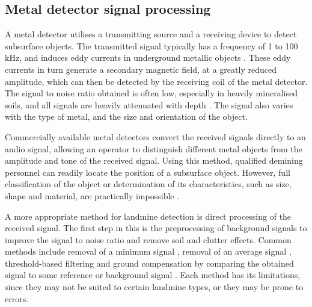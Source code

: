 \documentclass[main.tex]{subfiles}
\begin{document}
\subsection{Metal detector signal processing}
A metal detector utilises a transmitting source and a receiving device to detect subsurface objects. The transmitted signal typically has a frequency of 1 to 100 kHz, and induces eddy currents in underground metallic objects \parencite{bruschini2000phase}. These eddy currents in turn generate a secondary magnetic field, at a greatly reduced amplitude, which can then be detected by the receiving coil of the metal detector. The signal to noise ratio obtained is often low, especially in heavily mineralised soils, and all signals are heavily attenuated with depth \parencite{Candy2008}. The signal also varies with the type of metal, and the size and orientation of the object.

Commercially available metal detectors convert the received signals directly to an audio signal, allowing an operator to distinguish different metal objects from the amplitude and tone of the received signal. Using this method, qualified demining personnel can readily locate the position of a subsurface object. However, full classification of the object or determination of its characteristics, such as size, shape and material, are practically impossible \parencite{Kruger2006}.

A more appropriate method for landmine detection is direct processing of the received signal. The first step in this is the preprocessing of background signals to improve the signal to noise ratio and remove soil and clutter effects. Common methods include removal of a minimum signal \parencite{bhatia2000sensor}, removal of an average signal \parencite{bruschini02}, threshold-based  filtering \parencite{tran2009evaluation}  and ground compensation by comparing the obtained signal to some reference or background signal \parencite{Kruger2006}. Each method has its limitations, since they may not be suited to certain landmine types, or they may be prone to errors. 
\end{document}
